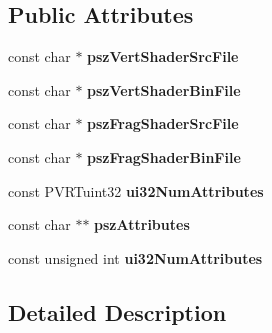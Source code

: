 \subsection*{Public Attributes}
\begin{DoxyCompactItemize}
\item 
\hypertarget{struct_shader_description_af6d3c01f622fec5c02c154407d69cc46}{const char $\ast$ {\bfseries psz\+Vert\+Shader\+Src\+File}}\label{struct_shader_description_af6d3c01f622fec5c02c154407d69cc46}

\item 
\hypertarget{struct_shader_description_a11d54e112da619fd56ee8b96383ada74}{const char $\ast$ {\bfseries psz\+Vert\+Shader\+Bin\+File}}\label{struct_shader_description_a11d54e112da619fd56ee8b96383ada74}

\item 
\hypertarget{struct_shader_description_a80f6ae12340ec5981468478b81afa320}{const char $\ast$ {\bfseries psz\+Frag\+Shader\+Src\+File}}\label{struct_shader_description_a80f6ae12340ec5981468478b81afa320}

\item 
\hypertarget{struct_shader_description_a84692cc05ac87ec75c5bc68bc3660f15}{const char $\ast$ {\bfseries psz\+Frag\+Shader\+Bin\+File}}\label{struct_shader_description_a84692cc05ac87ec75c5bc68bc3660f15}

\item 
\hypertarget{struct_shader_description_aa6c9b40d707d4ec4c1d49cb3ed415dd6}{const P\+V\+R\+Tuint32 {\bfseries ui32\+Num\+Attributes}}\label{struct_shader_description_aa6c9b40d707d4ec4c1d49cb3ed415dd6}

\item 
\hypertarget{struct_shader_description_ad1eaab945b4951713008e7ee21ec4f4a}{const char $\ast$$\ast$ {\bfseries psz\+Attributes}}\label{struct_shader_description_ad1eaab945b4951713008e7ee21ec4f4a}

\item 
\hypertarget{struct_shader_description_aa6c9b40d707d4ec4c1d49cb3ed415dd6}{const unsigned int {\bfseries ui32\+Num\+Attributes}}\label{struct_shader_description_aa6c9b40d707d4ec4c1d49cb3ed415dd6}

\end{DoxyCompactItemize}


\subsection{Detailed Description}


